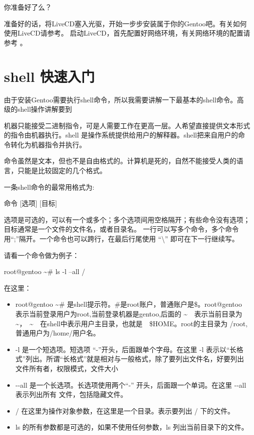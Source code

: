 你准备好了么？

准备好的话，将LiveCD塞入光驱，开始一步步安装属于你的Gentoo吧。有关如何使用LiveCD请参考。
启动LiveCD，首先配置好网络环境，有关网络环境的配置请参考 。


\section{shell 快速入门}\label{sec:quickbash}

由于安装Gentoo需要执行shell命令，所以我需要讲解一下最基本的shell命令。高级的shell操作讲解要到

机器只能接受二进制指令，可是人需要工作在更高一层。人希望直接提供文本形式的指令由机器执行。shell 是操作系统提供给用户的解释器。shell把来自用户的命令转化为机器指令并执行。

命令虽然是文本，但也不是自由格式的。计算机是死的，自然不能接受人类的语言，只能是比较固定的几个格式。

一条shell命令的最常用格式为:

\begin{code}
命令 [选项] [目标]
\end{code}

选项是可选的，可以有一个或多个；多个选项间用空格隔开；有些命令没有选项；目标通常是一个文件的文件名，或者目录名。
一行可以写多个命令，多个命令用“;”隔开。一个命令也可以跨行，在最后行尾使用  “\textbackslash”  即可在下一行继续写。


请看一个命令做为例子： 

\begin{code}
root@gentoo \textasciitilde \# ls -l --all /  
\end{code}
在这里：

\begin{itemize}
\item root@gentoo \textasciitilde \# 是shell提示符。\#是root账户，普通账户是\$。root@gentoo 表示当前登录用户为root,当前登录机器是gentoo,后面的 \textasciitilde{}　表示当前目录为　\textasciitilde{}，　\textasciitilde{}　在shell中表示用户主目录，也就是　\$HOME。root的主目录为 /root,　普通用户为/home/用户名。
\item -l 是一个短选项。短选项 “-”开头，后面跟单个字母。在这里 -l 表示以“长格式”列出。所谓“长格式”就是相对与一般格式，除了要列出文件名，好要列出文件所有者，权限模式，文件大小
\item -{}-all 是一个长选项。长选项使用两个“-” 开头，后面跟一个单词。在这里 -{}-all 表示列出所有 文件，包括隐藏文件。
\item / 在这里为操作对象参数，在这里是一个目录。表示要列出 / 下的文件。
\item ls 的所有参数都是可选的，如果不使用任何参数，ls 列出当前目录下的文件。

\end{itemize}

